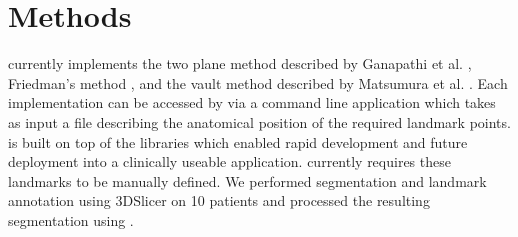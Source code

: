 \section{Methods}
\label{sec:methods}
\sksglenoid currently implements the two plane method described by Ganapathi et al. \cite{PMID:20933439}, Friedman's method \cite{PMID:1522089}, and the vault method described by Matsumura et al. \cite{PMID:24618285}. Each implementation can be accessed by via a command line application which takes as 
input a file describing the anatomical position of the required landmark points. 
\sksglenoid is built on top of the \sksurgery \cite{PMID:32436132} libraries which enabled 
rapid development and future deployment into a clinically useable application.  
\sksglenoid currently requires these landmarks to be manually defined. We performed segmentation 
and landmark annotation using 3DSlicer \cite{Kikinis2014} on 10 patients and processed the resulting 
segmentation using \sksglenoid.
